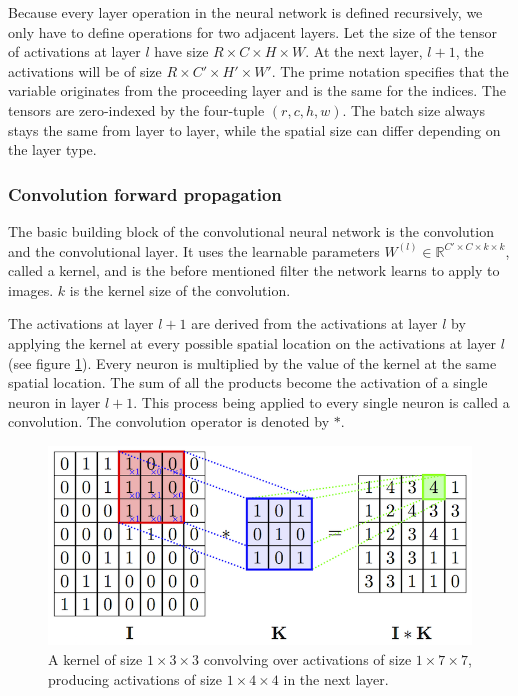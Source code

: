 \documentclass[a4paper,11pt,twoside]{article}
\begin{document}
Because every layer operation in the neural network is defined recursively, we only have to define operations for two adjacent layers. Let the size of the tensor of activations at layer $l$ have size $R \times C \times H \times W$. At the next layer, $l+1$, the activations will be of size $R \times C' \times H' \times W'$. The prime notation specifies that the variable originates from the proceeding layer and is the same for the indices. The tensors are zero-indexed by the four-tuple $(r, c, h, w)$. The batch size always stays the same from layer to layer, while the spatial size can differ depending on the layer type.

\subsubsection{Convolution forward propagation}
The basic building block of the convolutional neural network is the convolution and the convolutional layer. It uses the learnable parameters $W^{(l)} \in \mathbb{R}^{C' \times C  \times k \times k}$, called a kernel, and is the before mentioned filter the network learns to apply to images. $k$ is the kernel size of the convolution.

The activations at layer $l+1$ are derived from the activations at layer $l$ by applying the kernel at every possible spatial location on the activations at layer $l$ (see figure \ref{figkonv}). Every neuron is multiplied by the value of the kernel at the same spatial location. The sum of all the products become the activation of a single neuron in layer $l+1$. This process being applied to every single neuron is called a convolution. The convolution operator is denoted by $*$. 

\begin{figure}[h]
	\centering
  		\includegraphics[scale=2.1]{convolution.png}
  	\caption{A kernel of size $1 \times 3 \times 3$ convolving over activations of size $1 \times 7 \times 7$, producing activations of size $1 \times 4 \times 4$ in the next layer. \cite{figkonv}} \label{figkonv}
\end{figure}
\end{document}
